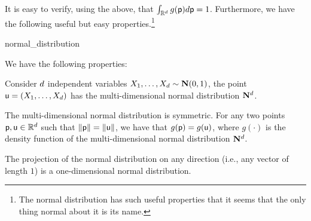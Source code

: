 \medskip

It is easy to verify, using the above, that $\int_{\mathbb{R}^d} g(\mathsf{p})
d\mathsf{p} = 1$. Furthermore, we have the following useful but easy
properties.\footnote{The normal distribution has such useful
   properties that it seems that the only thing normal about it is its
   name.}

\begin{fragment}{normal_distribution}
\begin{lemma}    
    We have the following properties:
    \begin{compactenumA}

        \smallskip%
        \item Consider $d$ independent variables
        $X_1, \ldots, X_\hdim \sim \NormalY{0}{1}$, the point
        $\mathsf{u} = (X_1, \ldots, X_d)$ has the multi-dimensional
        normal distribution $\mathbf{N}^{d}$.

        \smallskip%
        \item The multi-dimensional normal distribution is
        symmetric. For any two points $\mathsf{p}, \mathsf{u} \in \mathbb{R}^d$ such
        that $\left\| { \mathsf{p}} \right\| = \left\| {\mathsf{u}} \right\|$, we have that
        $g(\mathsf{p}) = g(\mathsf{u})$, where $g(\cdot)$ is the density function
        of the multi-dimensional normal distribution
        $\mathbf{N}^{d}$.

        \smallskip%
        \item The projection of the normal distribution on any
        direction (i.e., any vector of length $1$) is a
        one-dimensional normal distribution.
    \end{compactenumA}
\end{lemma} 
\end{fragment}
